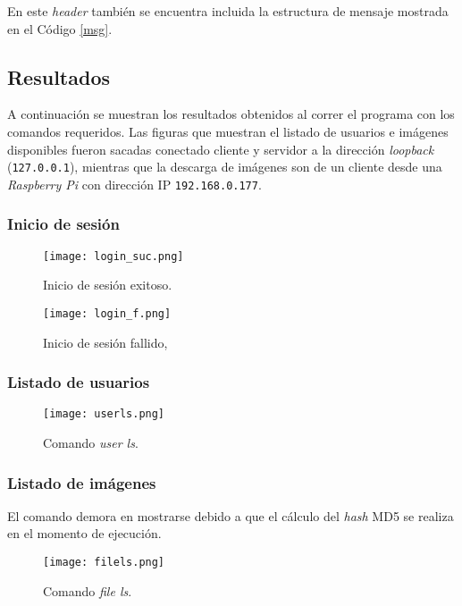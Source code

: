 \documentclass[12pt,a4paper]{article}
\begin{document}
En este \emph{header} también se encuentra incluida la estructura de mensaje
mostrada en el Código \ref{msg}.

\subsection{Resultados}
\label{resultados}
A continuación se muestran los resultados obtenidos al correr el programa con
los comandos requeridos. Las figuras que muestran el listado de usuarios e
imágenes disponibles fueron sacadas conectado cliente y servidor a la dirección
\emph{loopback} (\verb|127.0.0.1|), mientras que la descarga de imágenes son de
un cliente desde una \emph{Raspberry Pi} con dirección IP \verb|192.168.0.177|.

\subsubsection{Inicio de sesión}
\label{login}

\begin{figure}[H]
  \centering
  \texttt{[image: login\_suc.png]}
  \caption{Inicio de sesión exitoso.}
  \label{log_suc}
\end{figure}

\begin{figure}[H]
  \centering
  \texttt{[image: login\_f.png]}
  \caption{Inicio de sesión fallido,}
  \label{log_f}
\end{figure}

\subsubsection{Listado de usuarios}
\label{users}

\begin{figure}[H]
  \centering
  \texttt{[image: userls.png]}
  \caption{Comando \emph{user ls}.}
  \label{userls}
\end{figure}

\newpage

\subsubsection{Listado de imágenes}
\label{files}

El comando demora en mostrarse debido a que el cálculo del \emph{hash} MD5 se
realiza en el momento de ejecución.

\begin{figure}[H]
  \centering
  \texttt{[image: filels.png]}
  \caption{Comando \emph{file ls}.}
  \label{filels}
\end{figure}
\end{document}
